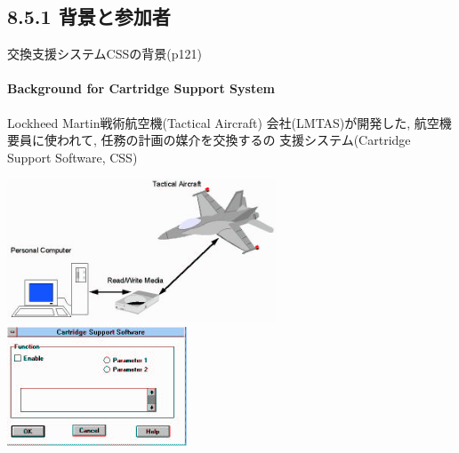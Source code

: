 \subsection{8.5.1 背景と参加者}
\begin{frame}{交換支援システムCSSの背景(p121)}
\framesubtitle{Background for Cartridge Support System}
Lockheed Martin戦術航空機(Tactical Aircraft)
会社(LMTAS)が開発した, 航空機要員に使われて, 任務の計画の媒介を交換するの
支援システム(Cartridge Support Software, CSS)

\begin{center}
\includegraphics[width=0.6\textwidth,height=0.5\textheight,keepaspectratio]{figure/CSS.png}
\includegraphics[width=0.4\textwidth,height=0.5\textheight,keepaspectratio]{figure/CSSdialog.png}
\end{center}


\end{frame}
